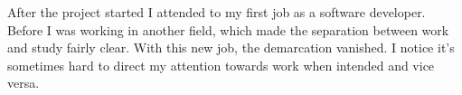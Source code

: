 After the project started I attended to my first job as a software developer. 
Before I was working in another field, which made the separation between work 
and study fairly clear. With this new job, the demarcation vanished. I notice 
it's sometimes hard to direct my attention towards work when intended and vice 
versa. 


